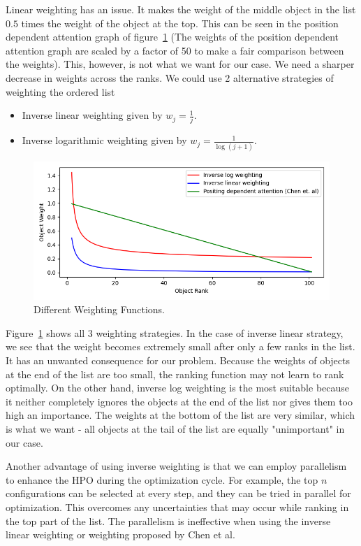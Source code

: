 \documentclass[12pt, twoside, ngerman]{report}
\begin{document}
Linear weighting has an issue. It makes the weight of the middle object in the list $0.5$ times the weight of the object at the top.
This can be seen in the position dependent attention graph of figure~\ref{fig:weightingfunctions} (The weights of the position dependent attention graph are scaled by a factor of 50 to make a fair comparison between the weights).
This, however, is not what we want for our case.
We need a sharper decrease in weights across the ranks.
We could use 2 alternative strategies of weighting the ordered list
\begin{itemize}
\item Inverse linear weighting given by $w_j = \frac{1}{j}$.
\item Inverse logarithmic weighting given by $w_j = \frac{1}{\log (j+1)}$.
\end{itemize}

\begin{figure}[htb]
  \centering
    \includegraphics[scale=0.65]{images/weightingfunctions}
    \caption{Different Weighting Functions.}
    \label{fig:weightingfunctions}
\end{figure}

Figure~\ref{fig:weightingfunctions} shows all 3 weighting strategies.
In the case of inverse linear strategy,  we see that the weight becomes extremely small after only a few ranks in the list.
It has an unwanted consequence for our problem.
Because the weights of objects at the end of the list are too small,  the ranking function may not learn to rank optimally.
On the other hand, inverse log weighting is the most suitable because it neither completely ignores the objects at the end of the list nor gives them too high an importance.
The weights at the bottom of the list are very similar, which is what we want - all objects at the tail of the list are equally "unimportant" in our case.

Another advantage of using inverse weighting is that we can employ parallelism to enhance the HPO during the optimization cycle.
For example, the top $n$ configurations can be selected at every step,  and they can be tried in parallel for optimization.
This overcomes any uncertainties that may occur while ranking in the top part of the list. 
The parallelism is ineffective when using the inverse linear weighting or weighting proposed by Chen et al.
\end{document}
